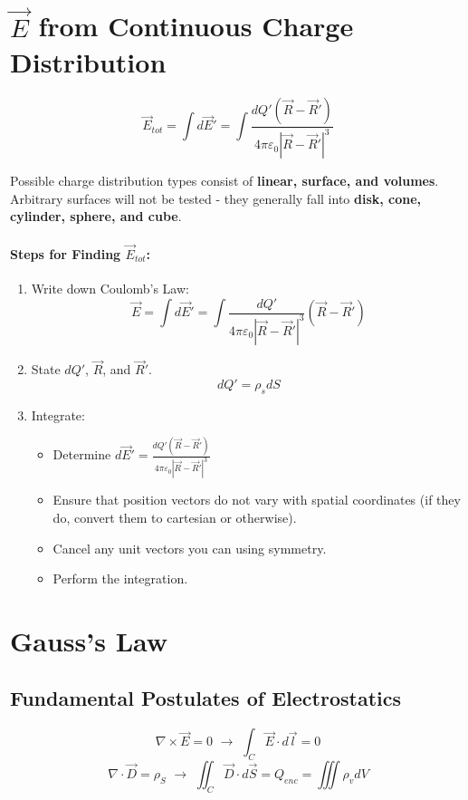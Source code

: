 \documentclass[a4paper,12pt]{report}
\begin{document}
\section{$\vec{E}$ from Continuous Charge Distribution}

$$\vec{E}_{tot} = \int d\vec{E}' = \int \frac{dQ' (\vec{R} - \vec{R}')}{4\pi\varepsilon_0 |\vec{R} - \vec{R}'|^3}$$

Possible charge distribution types consist of \textbf{linear, surface, and volumes}. Arbitrary surfaces will not be tested - they generally fall into 
\textbf{disk, cone, cylinder, sphere, and cube}.

\paragraph{Steps for Finding $\vec{E}_{tot}$:}
\begin{enumerate}
\item Write down Coulomb's Law:
$$\vec{E} = \int d\vec{E}' = \int \frac{dQ'}{4\pi\varepsilon_0 |\vec{R}-\vec{R}'|^3} (\vec{R}-\vec{R}') $$
\item State $dQ'$, $\vec{R}$, and $\vec{R}'$.
$$dQ' = \rho_s dS$$

\item Integrate: 
\begin{itemize}
\item Determine $d\vec{E}' = \frac{dQ'(\vec{R}-\vec{R}')}{4\pi\varepsilon_0 |\vec{R}-\vec{R}'|^3}$
\item Ensure that position vectors do not vary with spatial coordinates (if they do, convert them to cartesian or otherwise).
\item Cancel any unit vectors you can using symmetry.
\item Perform the integration. 
\end{itemize}
\end{enumerate}

\section{Gauss's Law}
\subsection{Fundamental Postulates of Electrostatics}
$$\nabla \times \vec{E} = 0 \,\, \to \,\, \int_C \vec{E} \cdot d\vec{l} = 0$$
$$\nabla \cdot \vec{D} = \rho_S \,\, \to \,\, \iint_C \vec{D} \cdot d\vec{S} = Q_{enc} = \iiint \rho_v dV$$
\end{document}
